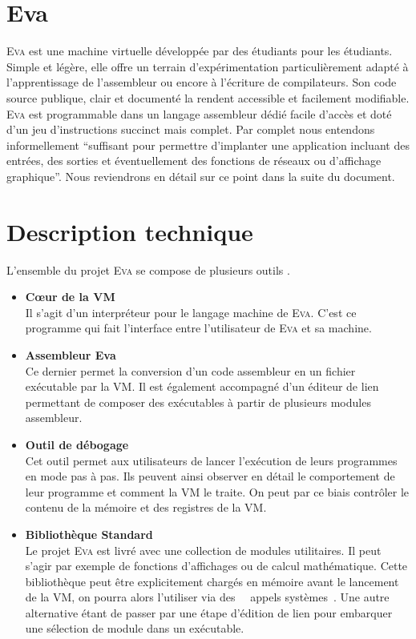 \documentclass[11pt,twoside]{article}
\makeatletter
\providecommand{\og}{\leavevmode\flqq~}%
\providecommand{\fg}{\ifdim\lastskip>\z@\unskip\fi~\frqq}%
\newcommand{\noun}[1]{\textsc{#1}}
\makeatother
\begin{document}
\vfill
\hspace{0pt}
\newpage{}

\section{Eva}

\noun{Eva} est une machine virtuelle développée par des étudiants pour les
étudiants. Simple et légère, elle offre un terrain d'expérimentation
particulièrement adapté à l'apprentissage de l'assembleur ou encore
à l'écriture de compilateurs. Son code source publique, clair et documenté
la rendent accessible et facilement modifiable. \noun{Eva} est programmable
dans un langage assembleur dédié facile d'accès et doté d'un jeu d'instructions
succinct mais complet. Par complet nous entendons informellement ``suffisant pour permettre d'implanter une application incluant des entrées, des sorties et éventuellement des fonctions de réseaux ou d'affichage graphique''. Nous reviendrons en détail sur ce point dans la suite du document.

\section{Description technique}

L'ensemble du projet \noun{Eva} se compose de plusieurs outils .

\begin{itemize}
  \item \textbf{Cœur de la VM} \\
        Il s'agit d'un interpréteur pour le langage machine de \noun{Eva}. C'est ce programme qui fait l'interface entre l'utilisateur de \noun{Eva} et sa machine.

  \item \textbf{Assembleur Eva} \\
        Ce dernier permet la conversion d'un code assembleur en un fichier exécutable par la VM. Il est également accompagné d'un éditeur de lien permettant de composer des exécutables à partir de plusieurs modules assembleur.

  \item \textbf{Outil de débogage} \\
        Cet outil permet aux utilisateurs de lancer l’exécution de leurs programmes en mode pas à pas. Ils peuvent ainsi observer en détail le comportement de leur programme et comment la VM le traite. On peut par ce biais contrôler le contenu de la mémoire et des registres de la VM.


  \item \textbf{Bibliothèque Standard} \\
        Le projet \noun{Eva} est livré avec une collection de modules utilitaires. Il peut s'agir par exemple de fonctions d'affichages ou de calcul mathématique. Cette bibliothèque peut être explicitement chargés en mémoire avant le lancement de la VM, on pourra alors l'utiliser via des \og~appels systèmes\fg. Une autre alternative étant de passer par une étape d'édition de lien pour embarquer une sélection de module dans un exécutable.

\end{itemize}
\end{document}
